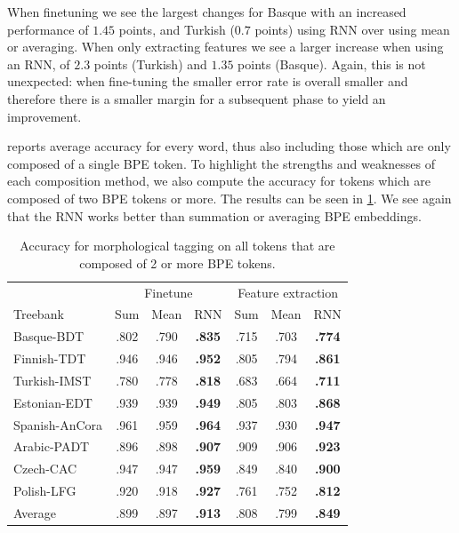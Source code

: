 \documentclass[11pt]{article}
\newcommand\jp[1]{(\textbf{JP:} #1)}
\begin{document}

        When finetuning we see the largest changes for Basque with an
        increased performance of $1.45$ points, and Turkish ($0.7$
        points) using RNN over using mean or averaging. When only
        extracting features we see a larger increase when using an
        RNN, of $2.3$ points (Turkish) and $1.35$ points
        (Basque). Again, this is not unexpected: when fine-tuning the
        smaller error rate is overall smaller and therefore there is a
        smaller margin for a subsequent phase to yield an improvement.

     reports average accuracy for every word,
    thus also including those which are only composed of a single BPE
    token. To highlight the strengths and weaknesses of each
    composition method, we also compute the accuracy for tokens which
    are composed of two BPE tokens or more. The results can be seen in
    \cref{tab:results_large_tokens}.  We see again that the RNN works
    better than summation or averaging BPE embeddings.
    
	\begin{table}%
	\centering
	\begin{tabular}{l|ccc|ccc}
		 & \multicolumn{3}{c}{Finetune} & \multicolumn{3}{c}{Feature extraction} \\
		Treebank & Sum & Mean & RNN & Sum & Mean & RNN  \\
		 \hline
        Basque-BDT      & .802 & .790 & \textbf{.835} & .715 & .703 & \textbf{.774} \\
		Finnish-TDT     & .946 & .946 & \textbf{.952} & .805 & .794 & \textbf{.861} \\ 
		Turkish-IMST    & .780 & .778 & \textbf{.818} & .683 & .664 & \textbf{.711} \\
		Estonian-EDT    & .939 & .939 & \textbf{.949} & .805 & .803 & \textbf{.868} \\
		Spanish-AnCora  & .961 & .959 & \textbf{.964} & .937 & .930 & \textbf{.947} \\
		Arabic-PADT     & .896 & .898 & \textbf{.907} & .909 & .906 & \textbf{.923}\\
		Czech-CAC       & .947 & .947 & \textbf{.959} & .849 & .840 & \textbf{.900} \\
		Polish-LFG      & .920 & .918 & \textbf{.927} & .761 & .752 & \textbf{.812} \\
        \hline
        Average         & .899 & .897 & \textbf{.913} & .808 & .799 & \textbf{.849} \\
	\end{tabular}
    	\caption{\label{tab:results_large_tokens} Accuracy for
     morphological tagging on all tokens that are composed of 2 or
     more BPE tokens.}
\end{table}
\end{document}
